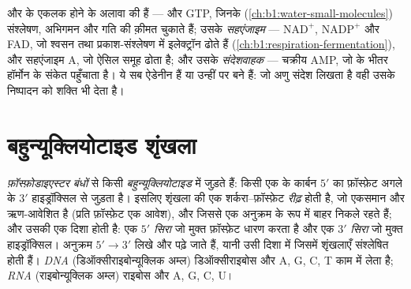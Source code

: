 \begin{proposition}[न्यूक्लियोटाइड तीन काम करते हैं]\label{prop:b1:nucleic-acids:threejobs}
 और  के एकलक होने के अलावा   की
\emph{} हैं ---  और GTP, जिनके 
(\cref{ch:b1:water-small-molecules}) संश्लेषण, अभिगमन और गति की क़ीमत
चुकाते हैं; उसके \emph{सहएंजाइम} --- $\mathrm{NAD^+}$, $\mathrm{NADP^+}$
और FAD, जो श्वसन तथा प्रकाश-संश्लेषण में इलेक्ट्रॉन ढोते हैं
(\cref{ch:b1:respiration-fermentation}), और सहएंजाइम A, जो ऐसिल समूह
ढोता है; और उसके \emph{संदेशवाहक} --- चक्रीय AMP, जो  के भीतर
हॉर्मोन के संकेत पहुँचाता है। ये सब ऐडेनीन  हैं या उन्हीं
पर बने हैं: जो अणु संदेश लिखता है वही उसके निष्पादन को शक्ति भी देता है।
\end{proposition}

\section{बहुन्यूक्लियोटाइड शृंखला}

\begin{definition}[फ़ॉस्फ़ोडाइएस्टर बंध, ध्रुवता]\label{def:b1:nucleic-acids:chain}
 \emph{फ़ॉस्फ़ोडाइएस्टर बंधों}
से किसी \emph{बहुन्यूक्लियोटाइड} में जुड़ते
हैं: किसी एक  के कार्बन $5'$ का फ़ॉस्फ़ेट अगले के $3'$
हाइड्रॉक्सिल से जुड़ता है। इसलिए शृंखला की एक शर्करा--फ़ॉस्फ़ेट
\emph{रीढ़} होती है, जो एकसमान और ऋण-आवेशित है (प्रति फ़ॉस्फ़ेट एक
आवेश), और जिससे  एक अनुक्रम के रूप में बाहर निकले रहते हैं; और उसकी
एक दिशा होती है: एक \emph{$5'$ सिरा} जो मुक्त
फ़ॉस्फ़ेट धारण करता है और एक \emph{$3'$ सिरा} जो
मुक्त हाइड्रॉक्सिल। अनुक्रम $5' \to 3'$ लिखे और पढ़े जाते हैं, यानी उसी
दिशा में जिसमें शृंखलाएँ संश्लेषित होती हैं। \emph{DNA}
(डिऑक्सीराइबोन्यूक्लिक अम्ल) डिऑक्सीराइबोस और  A, G, C, T काम में
लेता है; \emph{RNA} (राइबोन्यूक्लिक अम्ल) राइबोस और A, G, C, U।
\end{definition}

